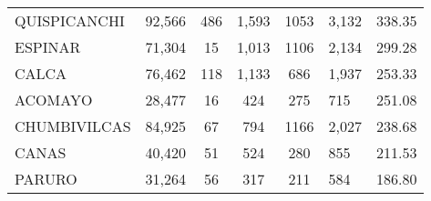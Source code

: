 \begin{tabular}{lrccclr}
	\cellcolor[HTML]{FFE699}QUISPICANCHI                           & 92,566                                                         & 486                                                         & 1,593                & 1053                     & 3,132                                                               & 338.35                                                                       \\
	\cellcolor[HTML]{FFE699}ESPINAR                                & 71,304                                                         & 15                                                          & 1,013                & 1106                     & 2,134                                                               & 299.28                                                                       \\
	\cellcolor[HTML]{FFE699}CALCA                                  & 76,462                                                         & 118                                                         & 1,133                & 686                      & 1,937                                                               & 253.33                                                                       \\
	\cellcolor[HTML]{FFE699}ACOMAYO                                & 28,477                                                         & 16                                                          & 424                  & 275                      & 715                                                                 & 251.08                                                                       \\
	\cellcolor[HTML]{FFE699}CHUMBIVILCAS                           & 84,925                                                         & 67                                                          & 794                  & 1166                     & 2,027                                                               & 238.68                                                                       \\
	\cellcolor[HTML]{C6E0B4}CANAS                                  & 40,420                                                         & 51                                                          & 524                  & 280                      & 855                                                                 & 211.53                                                                       \\
	\cellcolor[HTML]{C6E0B4}PARURO                                 & 31,264                                                         & 56                                                          & 317                  & 211                      & 584                                                                 & 186.80                                                                       \\

\end{tabular}
